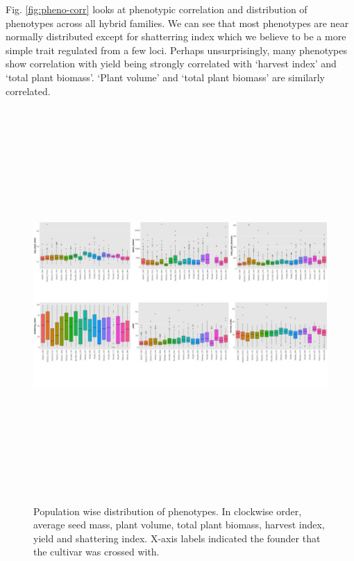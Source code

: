 Fig. \ref{fig:pheno-corr} looks at phenotypic correlation and distribution of phenotypes across all hybrid families. We can see that most phenotypes are near normally distributed except for shatterring index which we believe to be a more simple trait regulated from a few loci. Perhaps unsurprisingly, many phenotypes show correlation with yield being strongly correlated with `harvest index' and `total plant biomass'. `Plant volume' and `total plant biomass' are similarly correlated. 

\begin{figure}
    \centering
    \includegraphics[height = 15cm, width = 15cm]{tex/chickpea/pop-wise-dist.jpg}
    \caption{Population wise distribution of phenotypes. In clockwise order, average seed mass, plant volume, total plant biomass, harvest index, yield and shattering index. X-axis labels indicated the founder that the cultivar was crossed with.}
    \label{fig:pop-dist}
\end{figure}

